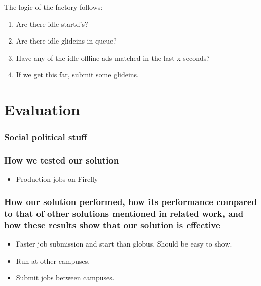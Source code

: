 \documentclass[11pt]{article}
\begin{document}
The logic of the factory follows:

\begin{enumerate}
\item Are there idle startd's?
\item Are there idle glideins in queue?
\item Have any of the idle offline ads matched in the last x seconds?
\item If we get this far, submit some glideins. 
\end{enumerate}


\section{Evaluation}
\label{sec:Evaluation}

\subsubsection*{Social political stuff}

\subsubsection*{How we tested our solution}
\begin{itemize}

\item Production jobs on Firefly

\end{itemize}


\subsubsection*{How our solution performed, how its performance compared to
that of other solutions mentioned in related work, and how these results show
that our solution is effective}

\begin{itemize}

\item
Faster job submission and start than globus.  Should be easy to show.

\item
Run at other campuses.

\item
Submit jobs between campuses.

\end{itemize}
\end{document}
